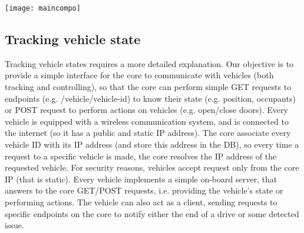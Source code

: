 \texttt{[image: maincompo]}
\newpage
\subsection{Tracking vehicle state}
Tracking vehicle states requires a more detailed explanation. Our objective is to provide a simple interface for the core to communicate with vehicles (both tracking and controlling), so that the core can perform simple GET requests to endpoints (e.g. /vehicle/vehicle-id) to know their state (e.g. position, occupants) or POST request to perform actions on vehicles (e.g. open/close doors). Every vehicle is equipped with a wireless communication system, and is connected to the internet (so it has a public and static IP address). The core associate every vehicle ID with its IP address (and store this address in the DB), so every time a request to a specific vehicle is made, the core resolves the IP address of the requested vehicle. For security reasons, vehicles accept request only from the core IP (that is static). Every vehicle implements a simple on-board server, that answers to the core GET/POST requests, i.e. providing the vehicle's state or performing actions.
The vehicle can also act as a client, sending requests to specific endpoints on the core to notify either the end of a drive or some detected issue. 
\newpage

